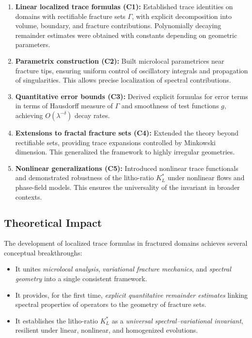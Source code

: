 \begin{enumerate}[label=(C\arabic*)]
  \item \textbf{Linear localized trace formulas (C1):} Established trace identities
  on domains with rectifiable fracture sets $\Gamma$, with explicit
  decomposition into volume, boundary, and fracture contributions.
  Polynomially decaying remainder estimates were obtained with constants
  depending on geometric parameters.
  \item \textbf{Parametrix construction (C2):} Built microlocal parametrices
  near fracture tips, ensuring uniform control of oscillatory integrals
  and propagation of singularities. This allows precise localization of
  spectral contributions.
  \item \textbf{Quantitative error bounds (C3):} Derived explicit formulas for
  error terms in terms of Hausdorff measure of $\Gamma$ and smoothness
  of test functions $g$, achieving $O(\lambda^{-\delta})$ decay rates.
  \item \textbf{Extensions to fractal fracture sets (C4):} Extended the theory
  beyond rectifiable sets, providing trace expansions controlled by
  Minkowski dimension. This generalized the framework to highly
  irregular geometries.
  \item \textbf{Nonlinear generalizations (C5):} Introduced nonlinear trace
  functionals and demonstrated robustness of the litho-ratio $K_L^*$
  under nonlinear flows and phase-field models. This ensures the
  universality of the invariant in broader contexts.
\end{enumerate}

\subsection{Theoretical Impact}

The development of localized trace formulas in fractured domains
achieves several conceptual breakthroughs:

\begin{itemize}
  \item It unites \emph{microlocal analysis}, \emph{variational fracture
  mechanics}, and \emph{spectral geometry} into a single consistent framework.
  \item It provides, for the first time, \emph{explicit quantitative remainder
  estimates} linking spectral properties of operators to the geometry
  of fracture sets.
  \item It establishes the litho-ratio $K_L^*$ as a \emph{universal spectral–variational invariant}, resilient under linear, nonlinear, and homogenized
  evolutions.
\end{itemize}

